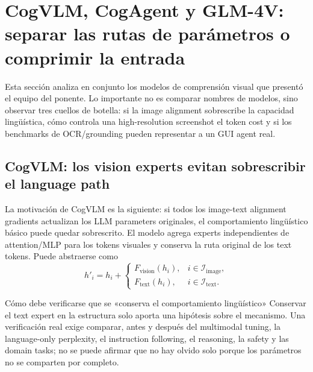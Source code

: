 \section{CogVLM, CogAgent y GLM-4V: separar las rutas de parámetros o comprimir la entrada}

Esta sección analiza en conjunto los modelos de comprensión visual que presentó el equipo del ponente. Lo importante no es comparar nombres de modelos, sino observar tres cuellos de botella: si la image alignment sobrescribe la capacidad lingüística, cómo controla una high-resolution screenshot el token cost y si los benchmarks de OCR/grounding pueden representar a un GUI agent real.

\subsection{CogVLM: los vision experts evitan sobrescribir el language path}

La motivación de CogVLM es la siguiente: si todos los image-text alignment gradients actualizan los LLM parameters originales, el comportamiento lingüístico básico puede quedar sobrescrito. El modelo agrega experts independientes de attention/MLP para los tokens visuales y conserva la ruta original de los text tokens. Puede abstraerse como
\[
h'_{i}=h_i+\begin{cases}
F_{\text{vision}}(h_i), & i\in\mathcal{I}_{\text{image}},\\
F_{\text{text}}(h_i), & i\in\mathcal{I}_{\text{text}}.
\end{cases}
\]


\begin{importantbox}{Cómo debe verificarse que se «conserva el comportamiento lingüístico»}
Conservar el text expert en la estructura solo aporta una hipótesis sobre el mecanismo. Una verificación real exige comparar, antes y después del multimodal tuning, la language-only perplexity, el instruction following, el reasoning, la safety y las domain tasks; no se puede afirmar que no hay olvido solo porque los parámetros no se comparten por completo.
\end{importantbox}



